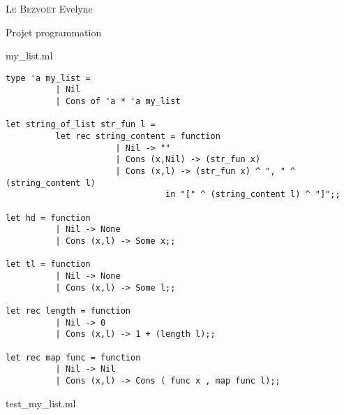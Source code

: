 \documentclass{report} %
\begin{document}

\textsc{Le Bezvoët} Evelyne

\begin{center}

\huge{Projet programmation}

\end{center}

my\_list.ml

\begin{lstlisting}[language=caml]
type 'a my_list =
          | Nil
          | Cons of 'a * 'a my_list

let string_of_list str_fun l =
          let rec string_content = function
                      | Nil -> ""
                      | Cons (x,Nil) -> (str_fun x)
                      | Cons (x,l) -> (str_fun x) ^ ", " ^ (string_content l)
                                in "[" ^ (string_content l) ^ "]";;

let hd = function
          | Nil -> None
          | Cons (x,l) -> Some x;;

let tl = function
          | Nil -> None
          | Cons (x,l) -> Some l;;

let rec length = function
          | Nil -> 0
          | Cons (x,l) -> 1 + (length l);;

let rec map func = function
          | Nil -> Nil
          | Cons (x,l) -> Cons ( func x , map func l);;
\end{lstlisting}


\newpage

test\_my\_list.ml
\end{document}
